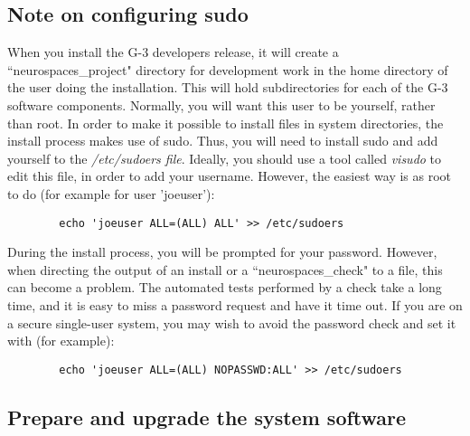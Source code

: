 \documentclass[12pt]{article}
\begin{document}
\subsection*{Note on configuring sudo}

When you install the G-3 developers release, it will create a
``neurospaces\_project" directory for development work in the home directory
of the user doing the installation.  This will hold subdirectories for each
of the G-3 software components.  Normally, you will want this user to be
yourself, rather than root.  In order to make it possible to install files
in system directories, the install process makes use of sudo.  Thus, you
will need to install sudo and add yourself to the {\it /etc/sudoers file}.
Ideally, you should use a tool called {\it visudo} to edit this file,
in order to add your username.  However, the easiest way is as root to do (for
example for user 'joeuser'):

\begin{verbatim}
        echo 'joeuser ALL=(ALL) ALL' >> /etc/sudoers
\end{verbatim}

During the install process, you will be prompted for your password.
However, when directing the output of an install or a
``neurospaces\_check" to a file, this can become a problem. The automated
tests performed by a check take a long time, and it is easy to
miss a password request and have it time out.  If you are on a secure
single-user system, you may wish to avoid the password check and set
it with (for example):

\begin{verbatim}
        echo 'joeuser ALL=(ALL) NOPASSWD:ALL' >> /etc/sudoers
\end{verbatim}

\subsection*{Prepare and upgrade the system software}
\end{document}
